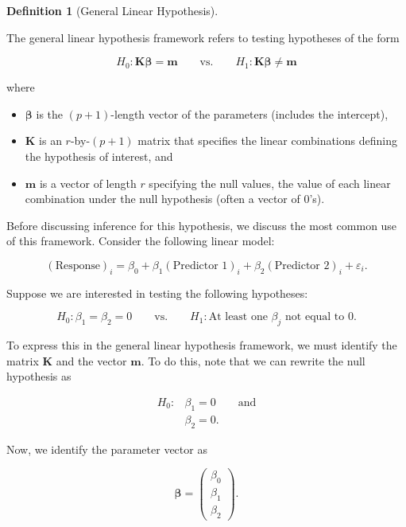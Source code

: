\documentclass[
  letterpaper,
  DIV=11,
  numbers=noendperiod]{scrreprt}
\providecommand{\tightlist}{%
  \setlength{\itemsep}{0pt}\setlength{\parskip}{0pt}}\usepackage{longtable,booktabs,array}
\theoremstyle{definition}
\theoremstyle{definition}
\newtheorem{definition}{Definition}[chapter]
\theoremstyle{remark}
\begin{document}
\begin{definition}[General Linear
Hypothesis]\protect\hypertarget{def-general-linear-hypothesis}{}\label{def-general-linear-hypothesis}

The general linear hypothesis framework refers to testing hypotheses of
the form

\[H_0: \mathbf{K}\boldsymbol{\beta} = \mathbf{m} \qquad \text{vs.} \qquad H_1: \mathbf{K}\boldsymbol{\beta} \neq \mathbf{m}\]

where

\begin{itemize}
\tightlist
\item
  \(\boldsymbol{\beta}\) is the \((p+1)\)-length vector of the
  parameters (includes the intercept),
\item
  \(\mathbf{K}\) is an \(r\)-by-\((p+1)\) matrix that specifies the
  linear combinations defining the hypothesis of interest, and
\item
  \(\mathbf{m}\) is a vector of length \(r\) specifying the null values,
  the value of each linear combination under the null hypothesis (often
  a vector of 0's).
\end{itemize}

\end{definition}

Before discussing inference for this hypothesis, we discuss the most
common use of this framework. Consider the following linear model:

\[(\text{Response})_i = \beta_0 + \beta_1 (\text{Predictor 1})_i + \beta_2 (\text{Predictor 2})_i + \varepsilon_i.\]

Suppose we are interested in testing the following hypotheses:

\[H_0: \beta_1 = \beta_2 = 0 \qquad \text{vs.} \qquad H_1: \text{At least one } \beta_j \text{ not equal to 0}.\]

To express this in the general linear hypothesis framework, we must
identify the matrix \(\mathbf{K}\) and the vector \(\mathbf{m}\). To do
this, note that we can rewrite the null hypothesis as

\[
\begin{aligned}
  H_0: & \beta_1 = 0 \qquad \text{and} \\
  & \beta_2 = 0.
\end{aligned}
\]

Now, we identify the parameter vector as

\[\boldsymbol{\beta} = \begin{pmatrix} 
\beta_0 \\
\beta_1 \\
\beta_2 \end{pmatrix}.\]
\end{document}
